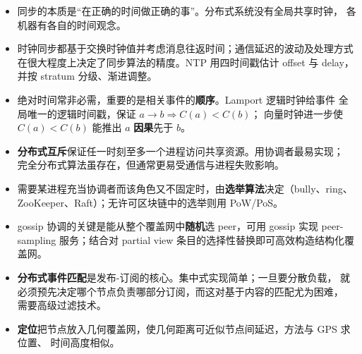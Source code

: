 \begin{closeread}
\end{closeread}



\begin{itemize}
  \item 同步的本质是“在正确的时间做正确的事”。分布式系统没有全局共享时钟，
        各机器有各自的时间观念。
  \item 时钟同步都基于交换时钟值并考虑消息往返时间；通信延迟的波动及处理方式
        在很大程度上决定了同步算法的精度。NTP 用四时间戳估计 offset 与 delay，
        并按 stratum 分级、渐进调整。
  \item 绝对时间常非必需，重要的是相关事件的\textbf{顺序}。Lamport 逻辑时钟给事件
        全局唯一的逻辑时间戳，保证 $a \rightarrow b \Rightarrow C(a) < C(b)$；
        向量时钟进一步使 $C(a) < C(b)$ 能推出 $a$ \textbf{因果}先于 $b$。
  \item \textbf{分布式互斥}保证任一时刻至多一个进程访问共享资源。用协调者最易实现；
        完全分布式算法虽存在，但通常更易受通信与进程失败影响。
  \item 需要某进程充当协调者而该角色又不固定时，由\textbf{选举算法}决定（bully、ring、
        ZooKeeper、Raft）；无许可区块链中的选举则用 PoW/PoS。
  \item gossip 协调的关键是能从整个覆盖网中\textbf{随机}选 peer，可用 gossip 实现
        peer-sampling 服务；结合对 partial view 条目的选择性替换即可高效构造结构化覆盖网。
  \item \textbf{分布式事件匹配}是发布-订阅的核心。集中式实现简单；一旦要分散负载，
        就必须预先决定哪个节点负责哪部分订阅，而这对基于内容的匹配尤为困难，
        需要高级过滤技术。
  \item \textbf{定位}把节点放入几何覆盖网，使几何距离可近似节点间延迟，方法与 GPS 求位置、
        时间高度相似。
\end{itemize}

